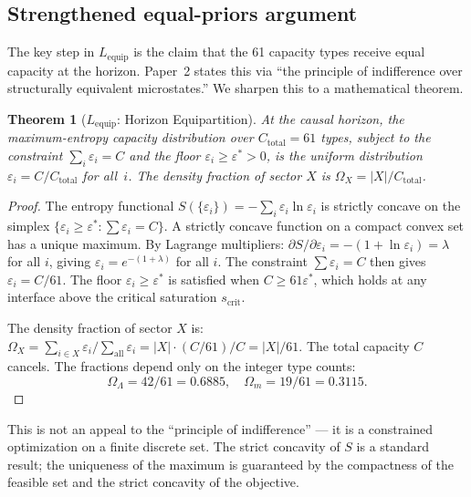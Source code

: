\documentclass[11pt,a4paper]{article}
\newtheorem{theorem}{Theorem}[section]
\theoremstyle{definition}
\newcommand{\eps}{\varepsilon}
\begin{document}

\subsection{Strengthened equal-priors argument}
\label{sec:equal_priors}

The key step in $L_{\mathrm{equip}}$ is the claim that the 61 capacity
types receive equal capacity at the horizon.  Paper~2 states this via
``the principle of indifference over structurally equivalent microstates.''
We sharpen this to a mathematical theorem.

\begin{theorem}[$L_{\mathrm{equip}}$: Horizon Equipartition]\label{thm:Lequip}
At the causal horizon, the maximum-entropy capacity distribution over
$C_{\mathrm{total}} = 61$ types, subject to the constraint
$\sum_i \eps_i = C$ and the floor $\eps_i \ge \eps^* > 0$, is the
uniform distribution $\eps_i = C / C_{\mathrm{total}}$ for all~$i$.
The density fraction of sector $X$ is
$\Omega_X = |X| / C_{\mathrm{total}}$.
\end{theorem}

\begin{proof}
The entropy functional $S(\{\eps_i\}) = -\sum_i \eps_i \ln \eps_i$
is strictly concave on the simplex
$\{\eps_i \ge \eps^* : \sum \eps_i = C\}$.  A strictly concave function
on a compact convex set has a unique maximum.  By Lagrange multipliers:
$\partial S / \partial \eps_i = -(1 + \ln \eps_i) = \lambda$ for all
$i$, giving $\eps_i = e^{-(1+\lambda)}$ for all $i$.  The constraint
$\sum \eps_i = C$ then gives $\eps_i = C / 61$.  The floor
$\eps_i \ge \eps^*$ is satisfied when $C \ge 61 \eps^*$, which holds
at any interface above the critical saturation $s_{\mathrm{crit}}$.

The density fraction of sector $X$ is:
$\Omega_X = \sum_{i \in X} \eps_i / \sum_{\mathrm{all}} \eps_i
= |X| \cdot (C/61) / C = |X|/61$.
The total capacity $C$ cancels.  The fractions depend only on the
integer type counts:
\[
  \Omega_\Lambda = 42/61 = 0.6885, \quad
  \Omega_m = 19/61 = 0.3115.
\]
\end{proof}

\noindent This is not an appeal to the ``principle of indifference''
--- it is a constrained optimization on a finite discrete set.  The
strict concavity of $S$ is a standard result; the uniqueness of the
maximum is guaranteed by the compactness of the feasible set and the
strict concavity of the objective.
\end{document}
